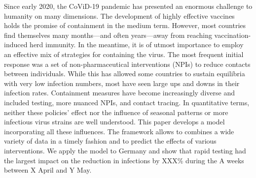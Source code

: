 Since early 2020, the CoViD-19 pandemic has presented an enormous challenge to humanity on many dimensions. The development of highly effective vaccines holds the promise of containment in the medium term. However, most countries find themselves many months---and often years---away from reaching vaccination-induced herd immunity. In the meantime, it is of utmost importance to employ an effective mix of strategies for containing the virus. The most frequent initial response was a set of non-pharmaceutical interventions (NPIs) to reduce contacts between individuals. While this has allowed some countries to sustain equilibria with very low infection numbers, most have seen large ups and downs in their infection rates. Containment measures have become increasingly diverse and included testing, more nuanced NPIs, and contact tracing. In quantitative terms, neither these policies' effect nor the influence of seasonal patterns or more infectious virus strains are well understood. This paper develops a model incorporating all these influences. The framework allows to combines a wide variety of data in a timely fashion and to predict the effects of various interventions. We apply the model to Germany and show that rapid testing had the largest impact on the reduction in infections by XXX\% during the A weeks between X April and Y May.

